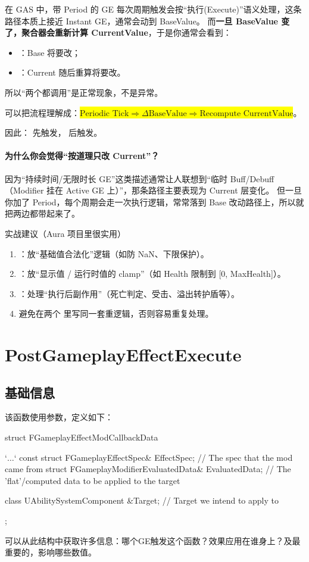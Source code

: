 \documentclass[10pt,CJKmath]{ctexart}
\begin{document}
在 GAS 中，带 Period 的 GE 每次周期触发会按“执行(Execute)”语义处理，这条路径本质上接近 Instant GE，通常会动到 BaseValue。 而\textbf{一旦 BaseValue 变了，聚合器会重新计算 CurrentValue}，于是你通常会看到：
\begin{itemize}
	\item {}：Base 将要改；
	\item {}：Current 随后重算将要改。
\end{itemize}
所以“两个都调用”是正常现象，不是异常。

可以把流程理解成：\colorbox{yellow}{$
\text{Periodic Tick} \Rightarrow \Delta \text{BaseValue} \Rightarrow \text{Recompute CurrentValue}$}。

因此： 先触发， 后触发。

\paragraph{为什么你会觉得“按道理只改 Current”？}
因为“持续时间/无限时长 GE”这类描述通常让人联想到“临时 Buff/Debuff（Modifier 挂在 Active GE 上）”，那条路径主要表现为 Current 层变化。
但一旦你加了 Period，每个周期会走一次执行逻辑，常常落到 Base 改动路径上，所以就把两边都带起来了。

实战建议（Aura 项目里很实用）
\begin{enumerate}
	\item {}：放“基础值合法化”逻辑（如防 NaN、下限保护）。
	\item {}：放“显示值 / 运行时值的 clamp”（如 Health 限制到 [0, MaxHealth]）。
	\item {}：处理“执行后副作用”（死亡判定、受击、溢出转护盾等）。
	\item 避免在两个  里写同一套重逻辑，否则容易重复处理。
\end{enumerate}

\section{PostGameplayEffectExecute}
\subsection{基础信息}
该函数使用参数，定义如下：
\begin{code}
struct FGameplayEffectModCallbackData
{
	`$\dots$`
	const struct FGameplayEffectSpec&		EffectSpec;		// The spec that the mod came from
	struct FGameplayModifierEvaluatedData&	EvaluatedData;	// The 'flat'/computed data to be applied to the target
	
	class UAbilitySystemComponent &Target;		// Target we intend to apply to
};
\end{code}
可以从此结构中获取许多信息：哪个GE触发这个函数？效果应用在谁身上？及最重要的，影响哪些数值。
\end{document}
